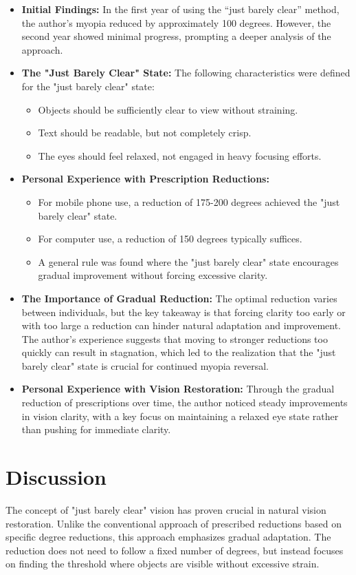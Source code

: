 \documentclass[12pt]{article}
\begin{document}
\begin{itemize}
    \item \textbf{Initial Findings:} In the first year of using the “just barely clear” method, the author’s myopia reduced by approximately 100 degrees. However, the second year showed minimal progress, prompting a deeper analysis of the approach.
    \item \textbf{The "Just Barely Clear" State:} The following characteristics were defined for the "just barely clear" state:
    \begin{itemize}
        \item Objects should be sufficiently clear to view without straining.
        \item Text should be readable, but not completely crisp.
        \item The eyes should feel relaxed, not engaged in heavy focusing efforts.
    \end{itemize}
    \item \textbf{Personal Experience with Prescription Reductions:}
    \begin{itemize}
        \item For mobile phone use, a reduction of 175-200 degrees achieved the "just barely clear" state.
        \item For computer use, a reduction of 150 degrees typically suffices.
        \item A general rule was found where the "just barely clear" state encourages gradual improvement without forcing excessive clarity.
    \end{itemize}
    \item \textbf{The Importance of Gradual Reduction:} The optimal reduction varies between individuals, but the key takeaway is that forcing clarity too early or with too large a reduction can hinder natural adaptation and improvement. The author’s experience suggests that moving to stronger reductions too quickly can result in stagnation, which led to the realization that the "just barely clear" state is crucial for continued myopia reversal.
    \item \textbf{Personal Experience with Vision Restoration:} Through the gradual reduction of prescriptions over time, the author noticed steady improvements in vision clarity, with a key focus on maintaining a relaxed eye state rather than pushing for immediate clarity.
\end{itemize}

\section{Discussion}
The concept of "just barely clear" vision has proven crucial in natural vision restoration. Unlike the conventional approach of prescribed reductions based on specific degree reductions, this approach emphasizes gradual adaptation. The reduction does not need to follow a fixed number of degrees, but instead focuses on finding the threshold where objects are visible without excessive strain.
\end{document}
